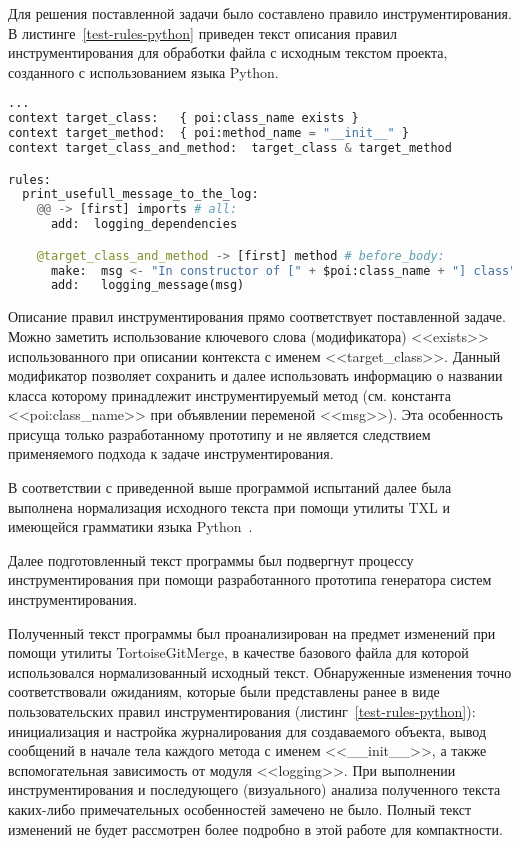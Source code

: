 Для решения поставленной задачи было составлено правило инструментирования.
В листинге~\ref{test-rules-python} приведен текст описания правил инструментирования для обработки файла с исходным текстом проекта, созданного с использованием языка Python.

\begin{lstlisting}[frame=single, language=Python, label={test-rules-python}, caption={Описание правил инструментирования. Python-проект.}]
...
context target_class:   { poi:class_name exists }
context target_method:  { poi:method_name = "__init__" }
context target_class_and_method:  target_class & target_method

rules:
  print_usefull_message_to_the_log:
    @@ -> [first] imports # all:
      add:  logging_dependencies

    @target_class_and_method -> [first] method # before_body:
      make:  msg <- "In constructor of [" + $poi:class_name + "] class";
      add:   logging_message(msg)
\end{lstlisting}

Описание правил инструментирования прямо соответствует поставленной задаче.
Можно заметить использование ключевого слова (модификатора) <<exists>> использованного при описании контекста с именем <<target\_class>>.
Данный модификатор позволяет сохранить и далее использовать информацию о названии класса которому принадлежит инструментируемый метод (см. константа <<poi:class\_name>> при объявлении переменой <<msg>>).
Эта особенность присуща только разработанному прототипу и не является следствием применяемого подхода к задаче инструментирования.

В соответствии с приведенной выше программой испытаний далее была выполнена нормализация исходного текста при помощи утилиты TXL и имеющейся грамматики языка Python~\cite{txl-resources}.

Далее подготовленный текст программы был подвергнут процессу инструментирования при помощи разработанного прототипа генератора систем инструментирования.

Полученный текст программы был проанализирован на предмет изменений при помощи утилиты TortoiseGitMerge, в качестве базового файла для которой использовался нормализованный исходный текст.
Обнаруженные изменения точно соответствовали ожиданиям, которые были представлены ранее в виде пользовательских правил инструментирования (листинг~\ref{test-rules-python}):
инициализация и настройка журналирования для создаваемого объекта,
вывод сообщений в начале тела каждого метода с именем <<\_\_init\_\_>>,
а также вспомогательная зависимость от модуля <<logging>>.
При выполнении инструментирования и последующего (визуального) анализа полученного текста каких-либо примечательных особенностей замечено не было.
Полный текст изменений не будет рассмотрен более подробно в этой работе для компактности.

